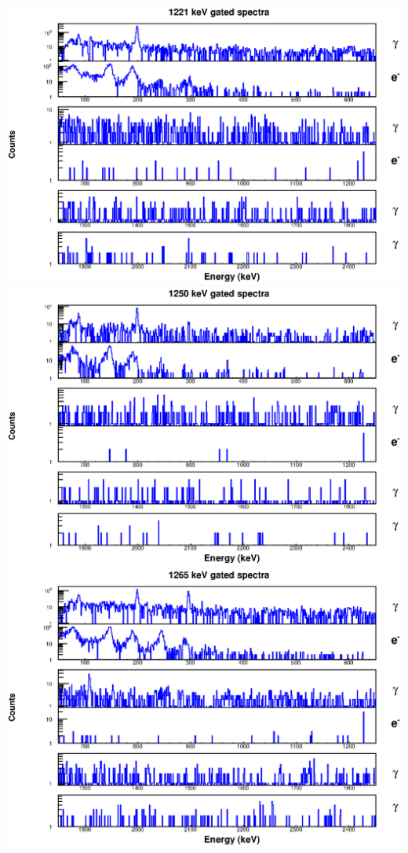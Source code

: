 \includegraphics[scale=0.8]{156Gd_Appendix/1221_combined.eps}
\includegraphics[scale=0.8]{156Gd_Appendix/1250_combined.eps}
\includegraphics[scale=0.8]{156Gd_Appendix/1265_combined.eps}
